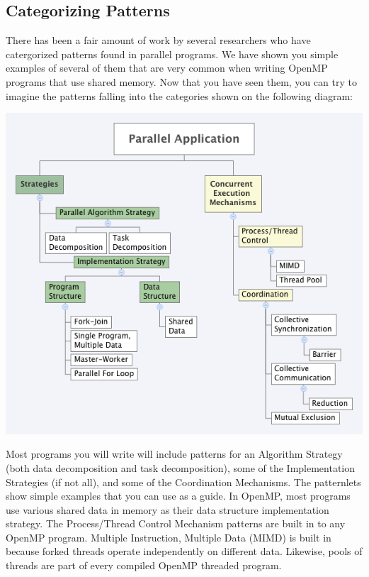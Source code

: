 \documentclass[letterpaper,10pt,openany,oneside]{sphinxmanual}
\begin{document}
\subsection{Categorizing Patterns}
\label{SharedMemory/patterns_diagram::doc}\label{SharedMemory/patterns_diagram:categorizing-patterns}
There has been a fair amount of work by several researchers who have catergorized patterns found in parallel programs.  We have shown you simple examples of several of them that are very common when writing OpenMP programs that use shared memory.  Now that you have seen them, you can try to imagine the patterns falling into the categories shown on the following diagram:

\includegraphics{OMP_Patterns.png}

Most programs you will write will include patterns for an Algorithm Strategy (both data decomposition and task decomposition), some of the Implementation Strategies (if not all), and some of the Coordination Mechanisms.  The patternlets show simple examples that you can use as a guide.  In OpenMP, most programs use various shared data in memory as their data structure implementation strategy. The Process/Thread Control Mechanism patterns are built in to any OpenMP program. Multiple Instruction, Multiple Data (MIMD) is built in because forked threads operate independently on different data. Likewise, pools of threads are part of every compiled OpenMP threaded program.



\renewcommand{\indexname}{Index}
\printindex
\end{document}

